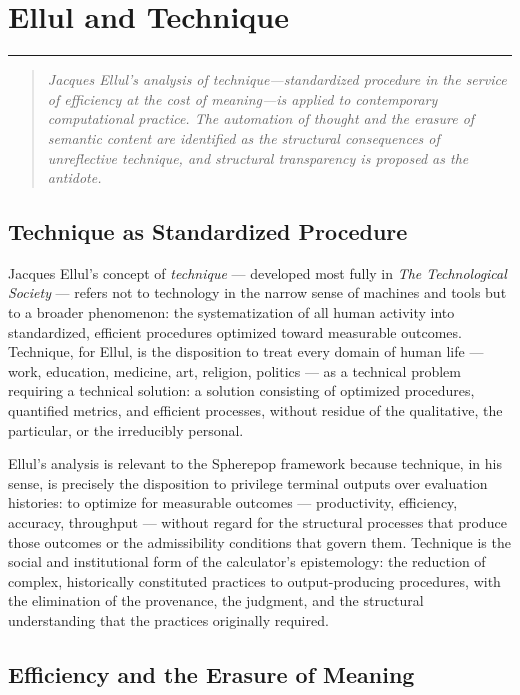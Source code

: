 \documentclass[12pt,openany]{book}
\theoremstyle{plain}
\theoremstyle{definition}
\theoremstyle{remark}
\newcommand{\chapterrule}{%
  \vspace{4pt}%
  {\color{SpherepopBlue}\rule{\textwidth}{0.8pt}}%
  \vspace{10pt}%
}
\newenvironment{chapterprecis}{%
  \begin{quote}\small\itshape}{%
  \end{quote}\medskip}
\begin{document}
\chapter{Ellul and Technique}
\chapterrule

\begin{chapterprecis}
Jacques Ellul's analysis of technique---standardized procedure
in the service of efficiency at the cost of meaning---is applied
to contemporary computational practice. The automation of thought
and the erasure of semantic content are identified as the
structural consequences of unreflective technique, and structural
transparency is proposed as the antidote.
\end{chapterprecis}

\section{Technique as Standardized Procedure}

Jacques Ellul's concept of \emph{technique} — developed most fully in \emph{The Technological Society} — refers not to technology in the narrow sense of machines and tools but to a broader phenomenon: the systematization of all human activity into standardized, efficient procedures optimized toward measurable outcomes. Technique, for Ellul, is the disposition to treat every domain of human life — work, education, medicine, art, religion, politics — as a technical problem requiring a technical solution: a solution consisting of optimized procedures, quantified metrics, and efficient processes, without residue of the qualitative, the particular, or the irreducibly personal.

Ellul's analysis is relevant to the Spherepop framework because technique, in his sense, is precisely the disposition to privilege terminal outputs over evaluation histories: to optimize for measurable outcomes — productivity, efficiency, accuracy, throughput — without regard for the structural processes that produce those outcomes or the admissibility conditions that govern them. Technique is the social and institutional form of the calculator's epistemology: the reduction of complex, historically constituted practices to output-producing procedures, with the elimination of the provenance, the judgment, and the structural understanding that the practices originally required.

\section{Efficiency and the Erasure of Meaning}
\end{document}
